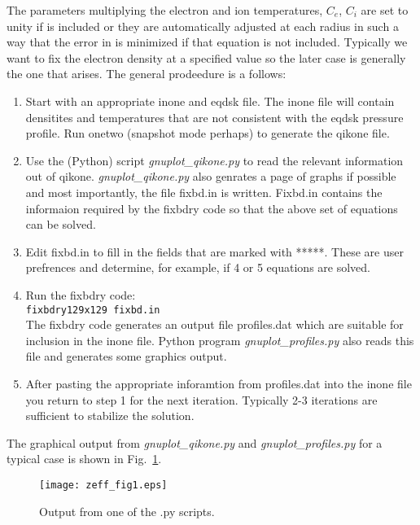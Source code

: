 The parameters multiplying the electron and ion temperatures, $C_e$, $C_i$ are
set to unity if  is included or they are automatically adjusted
at  each radius in such a way that the error in  is minimized if
that equation is not  included. Typically we want to fix the electron density at
a specified value so the later case is generally the one that arises.  The
general prodeedure is a follows:
\begin{enumerate}
 \item Start with an appropriate inone and eqdsk file. The inone file will
 contain densitites and temperatures that are not consistent with the eqdsk
 pressure profile. Run onetwo (snapshot mode perhaps) to generate the qikone 
 file.
 \item Use the (Python) script \emph{gnuplot\_qikone.py} to read the  relevant
 information out of qikone. \emph{gnuplot\_qikone.py} also genrates a page of
 graphs if possible and most importantly, the file fixbd.in is written. Fixbd.in
 contains the informaion required by the fixbdry code so that the above set of
 equations can be solved.
 \item Edit fixbd.in to fill in the fields that are marked with *****. These are
 user prefrences and determine, for example, if 4 or 5 equations are solved.
 \item Run the fixbdry code: \\
 \texttt{fixbdry129x129  fixbd.in} \\
 The fixbdry code generates an output file profiles.dat which are suitable for
 inclusion in the inone file. Python program \emph{gnuplot\_profiles.py} also
 reads this file and generates some graphics output.
 \item After pasting the appropriate inforamtion from profiles.dat into the
 inone file you return to step 1 for the next iteration. Typically 2-3
 iterations are sufficient to stabilize the solution.
\end{enumerate}
The graphical  output from \emph{gnuplot\_qikone.py}  and
\emph{gnuplot\_profiles.py} for a typical case is shown in Fig.~\ref{profiles}.
\begin{figure}
 \texttt{[image: zeff\_fig1.eps]}
 \caption{Output from one of the .py scripts.\label{profiles}}
\end{figure}
